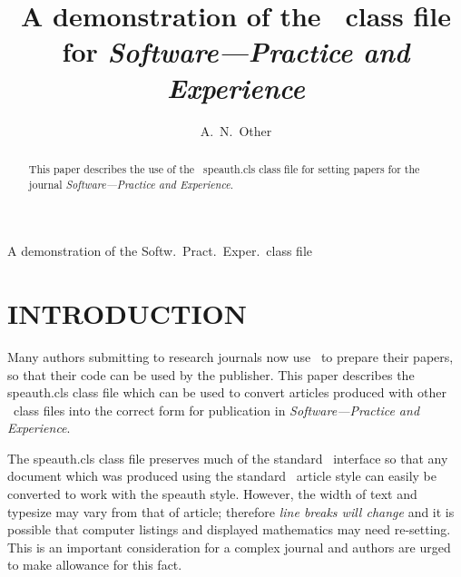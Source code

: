 \documentclass{speauth}
\begin{document}

{A demonstration of the Softw.\ Pract.\ Exper.\ class file}

\title{A demonstration of the \LaTeXe\ class file for 
\itshape{Software---Practice and Experience}\footnotemark[2]}

\author{A.~N.~Other\corrauth}

\address{Journals Production Dept, John Wiley \& Sons Ltd,
Baffins Lane, Chichester, West Sussex, PO19~1UD, UK\\
(email: speauth-cls@wiley.co.uk)}




\noaccepted{}

\begin{abstract}
This paper describes the use of the \LaTeXe\ \textsf{speauth.cls} class file
for setting papers for the journal \emph{Software---Practice and Experience}.
\end{abstract}


\section{INTRODUCTION}
Many authors submitting to research journals now use \LaTeXe\ to prepare
their papers, so that their code can be used by the publisher.
This paper describes the \textsf{speauth.cls} class file
which can be used to convert articles produced with other \LaTeXe\ class files
into the correct form for publication
in \emph{Software---Practice and Experience}.

The \textsf{speauth.cls} class file preserves much of the standard
\LaTeXe\ interface so that any document which was produced using
the standard \LaTeXe\ \textsf{article} style can easily be converted
to work with the \textsf{speauth} style.
However, the width of text and typesize
may vary from that of \textsf{article}; therefore
\emph{line breaks will change} and it is possible
that computer listings and displayed mathematics may need re-setting.
This is an important consideration for a complex journal
and authors are urged to make allowance for this fact.
\end{document}
